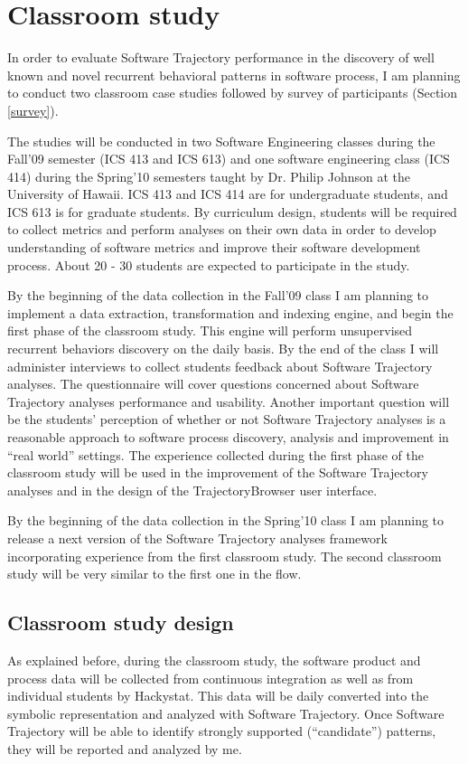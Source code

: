 \section{Classroom study}\label{classroom}
In order to evaluate Software Trajectory performance in the discovery of well known and novel recurrent behavioral patterns in software process, I am planning to conduct two classroom case studies followed by survey of participants (Section \ref{survey}). 

The studies will be conducted in two Software Engineering classes during the Fall'09 semester (ICS 413 and ICS 613) and one software engineering class (ICS 414) during the Spring'10 semesters taught by Dr. Philip Johnson at the University of Hawaii. ICS 413 and ICS 414 are for undergraduate students, and ICS 613 is for graduate students. By curriculum design, students will be required to collect metrics and perform analyses on their own data in order to develop understanding of software metrics and improve their software development process. About 20 - 30 students are expected to participate in the study. 

By the beginning of the data collection in the Fall'09 class I am planning to implement a data extraction, transformation and indexing engine, and begin the first phase of the classroom study. This engine will perform unsupervised recurrent behaviors discovery on the daily basis. By the end of the class I will administer interviews to collect students feedback about Software Trajectory analyses. The questionnaire will cover questions concerned about Software Trajectory analyses performance and usability. Another important question will be the students' perception of whether or not Software Trajectory analyses is a reasonable approach to software process discovery, analysis and improvement in ``real world'' settings. The experience collected during the first phase of the classroom study will be used in the improvement of the Software Trajectory analyses and in the design of the TrajectoryBrowser user interface.

By the beginning of the data collection in the Spring'10 class I am planning to release a next version of the Software Trajectory analyses framework incorporating experience from the first classroom study. The second classroom study will be very similar to the first one in the flow. 

\subsection{Classroom study design}
As explained before, during the classroom study, the software product and process data will be collected from continuous integration as well as from individual students by Hackystat. This data will be daily converted into the symbolic representation and analyzed with Software Trajectory. Once Software Trajectory will be able to identify strongly supported (``candidate'') patterns, they will be reported and analyzed by me.

